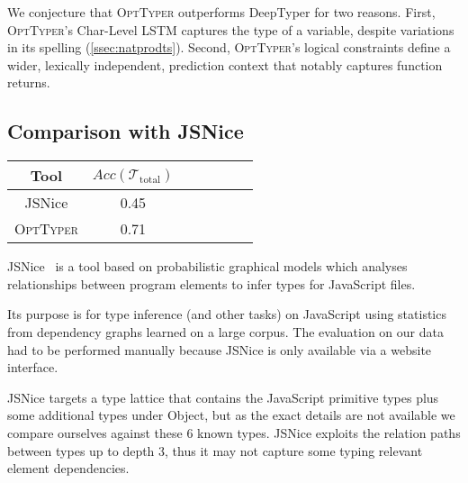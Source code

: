 \documentclass[acmsmall, review, anonymous]{acmart}\settopmatter{printfolios=true,printccs=false,printacmref=false}
\newcommand{\projectname}{\textsc{OptTyper}\xspace}
\begin{document}
We conjecture that \projectname outperforms DeepTyper for two reasons.  First, 
\projectname's Char-Level LSTM captures the type of a variable, despite variations 
in its spelling (\cref{ssec:natprodts}).  Second, \projectname's logical constraints define
a wider, lexically independent, prediction context that notably captures
function returns.


\subsection{Comparison with JSNice}
\begin{table*}[t]
	\centering
	\caption{Accuracy for JSNice and OptTyper; on 107 annotations slots (26 funRet, 78 param).}
		\label{tab:typeprec2}
	\begin{tabular}{ccccccc}
		\toprule
		Tool   &                              $Acc(\mathcal{T}_\text{total})$ \\
		\midrule
		JSNice     & 0.45\\
		\projectname & 0.71\\
		\bottomrule
	\end{tabular}
\end{table*}
 JSNice~\cite{raychev15} is a tool based on probabilistic graphical models which analyses relationships
	      between program elements to infer types for JavaScript files.


Its purpose is for type inference (and other tasks) on JavaScript
using statistics from dependency graphs learned on a large corpus.
The evaluation on our data had to be performed manually because JSNice is only available via a website interface.

JSNice targets a type lattice that contains the JavaScript primitive types plus some additional types under Object, 
but as the exact details are not available we compare ourselves against these 6 known types.
JSNice exploits the relation paths between types up to depth 3, thus it may not
capture some typing relevant element dependencies. 
\end{document}
